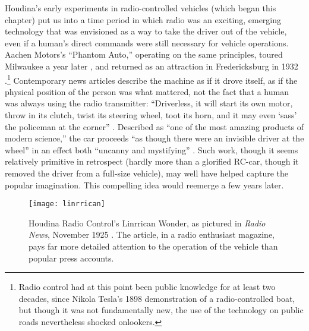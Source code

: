 Houdina's early experiments in radio-controlled vehicles (which began
this chapter) put us into a time period in which radio was an
exciting, emerging technology that was envisioned as a way to take
the driver out of the vehicle, even if a human's direct commands were
still necessary for vehicle operations. Aachen Motors's ``Phantom
Auto,'' operating on the same principles, toured Milwaukee a year
later \cite{phantomAuto}, and returned as an attraction in
Fredericksburg in 1932 \cite{phantomAuto2}.\footnote{Radio control had
  at this point been public knowledge for at least two 
decades, since Nikola Tesla's 1898 demonstration of a radio-controlled
boat, but though it was not fundamentally new, the use of the
technology on public roads nevertheless shocked onlookers.} Contemporary news articles
describe the machine as if it drove itself, 
as if the physical position of the person was what mattered, not the
fact that a human was always using the radio transmitter:  ``Driverless,
it will start its own motor, throw in its clutch, twist its steering
wheel, toot its horn, and it may even `sass' the policeman at the
corner'' \cite{phantomAuto}. Described as ``one of the most amazing products of
modern science,'' the 
car proceeds ``as though there were an invisible driver at the wheel''
in an effect both ``uncanny and mystifying'' \cite{phantomAuto2}. Such work,
though it seems relatively primitive in retrospect (hardly more than a
glorified RC-car, though it removed the driver from a full-size vehicle), may well have
helped capture the popular imagination. This compelling idea would reemerge
a few years later.

\begin{figure}[t]
  \begin{center}
  \texttt{[image: linrrican]}
  \end{center}
  \caption{Houdina Radio Control's Linrrican Wonder, as pictured in
    \emph{Radio News}, November 1925 \cite{greenRadio}. The article,
    in a radio enthusiast magazine, pays far more detailed attention to
    the operation of the vehicle than
    popular press accounts.}
\end{figure}


